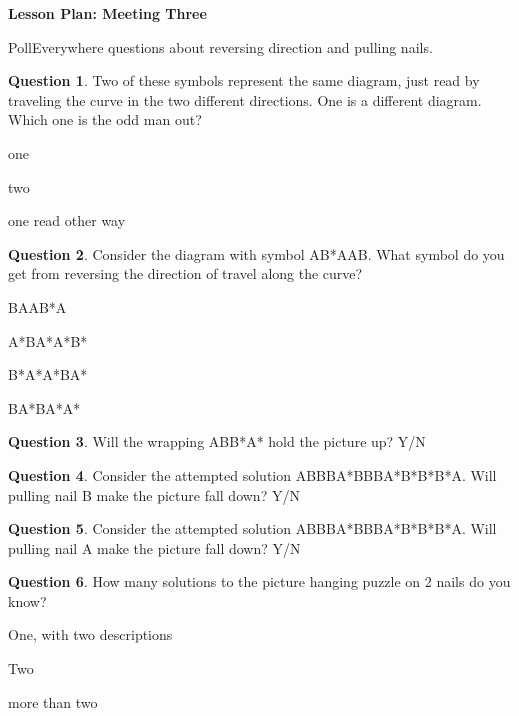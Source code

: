 \documentclass[12pt]{amsart}
\theoremstyle{definition}
\newtheorem{question}{Question}
\begin{document}
\begin{center}
\textbf{\Huge
Lesson Plan: Meeting Three
}
\end{center}
\vspace{.5in}

PollEverywhere questions about reversing direction and pulling nails.

\begin{question} Two of these symbols represent the same diagram, just read by traveling the curve in the two different directions. One is a different diagram. Which one is the odd man out?
    \begin{compactitem}
    \item one
    \item two
    \item one read other way
    \end{compactitem}
\end{question}

\begin{question} Consider the diagram with symbol AB*AAB. What symbol do you get from reversing the direction of travel along the curve?
    \begin{compactitem}
    \item BAAB*A
    \item A*BA*A*B*
    \item B*A*A*BA*
    \item BA*BA*A*
    \end{compactitem}
\end{question}

\begin{question} Will the wrapping ABB*A* hold the picture up?  Y/N
\end{question}

\begin{question} 
Consider the attempted solution ABBBA*BBBA*B*B*B*A. Will pulling nail B make the picture fall down? Y/N
\end{question}

\begin{question} 
Consider the attempted solution ABBBA*BBBA*B*B*B*A. Will pulling nail A make the picture fall down? Y/N
\end{question}

\begin{question} How many solutions to the picture hanging puzzle on 2 nails do you know?
    \begin{compactitem}
    \item One, with two descriptions
    \item Two
    \item more than two
    \end{compactitem}
\end{question}
\end{document}
